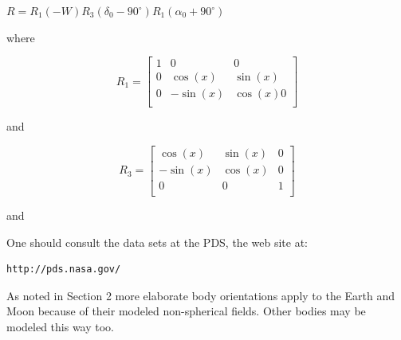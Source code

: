 \begin{center}
$
R = R_1 ( - W)R_3 (\delta _0  - 90^ \circ)R_1 (\alpha _0  + 90^ \circ  )
$
\end{center}
where
\begin{center}
    \begin{equation}\nonumber
    R_1= \left[
    \begin{array}{rrr}
     1   & 0 &  0\\
     0 &  \cos(x)  & \sin(x) \\
     0 & -\sin(x) & \cos(x) 0   \\
    \end{array}\right]
    \end{equation}
\end{center}
and
\begin{center}
    \begin{equation}\nonumber
    R_3= \left[
    \begin{array}{rrr} 
     \cos(x)  & \sin(x) & 0\\
     -\sin(x) & \cos(x) & 0 \\
      0 & 0 & 1\\
     
    \end{array}\right]
    \end{equation}
\end{center}
and

One should consult the data sets at the PDS,
the web site at:
\begin{verbatim}
http://pds.nasa.gov/
\end{verbatim}

As noted in Section 2 more elaborate body orientations apply to the Earth and Moon because of their modeled non-spherical fields. Other bodies may be modeled this way too.



